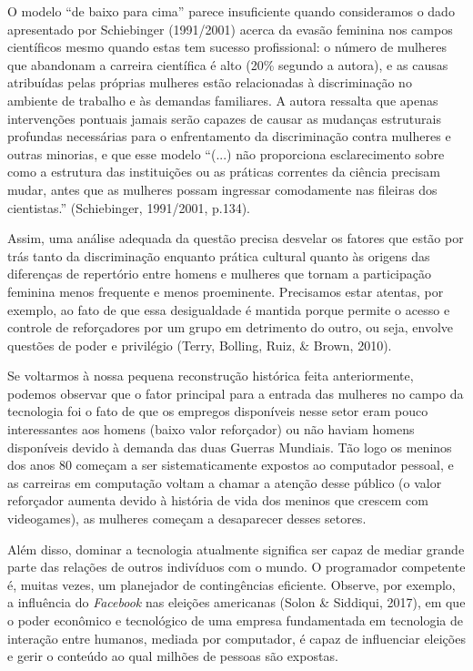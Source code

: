 O modelo “de baixo para cima” parece insuficiente quando consideramos o dado apresentado por Schiebinger (1991/2001) acerca da evasão feminina nos campos científicos mesmo quando estas tem sucesso profissional: o número de mulheres que abandonam a carreira científica é alto (20\% segundo a autora), e as causas atribuídas pelas próprias mulheres estão relacionadas à discriminação no ambiente de trabalho e às demandas familiares. A autora ressalta que apenas intervenções pontuais jamais serão capazes de causar as mudanças estruturais profundas necessárias para o enfrentamento da discriminação contra mulheres e outras minorias, e que esse modelo “(...) não proporciona esclarecimento sobre como a estrutura das instituições ou as práticas correntes da ciência precisam mudar, antes que as mulheres possam ingressar comodamente nas fileiras dos cientistas.” (Schiebinger, 1991/2001, p.134).

Assim, uma análise adequada da questão precisa desvelar os fatores que estão por trás tanto da discriminação enquanto prática cultural quanto às origens das diferenças de repertório entre homens e mulheres que tornam a participação feminina menos frequente e menos proeminente. Precisamos estar atentas, por exemplo, ao fato de que essa desigualdade é mantida porque permite o acesso e controle de reforçadores por um grupo em detrimento do outro, ou seja, envolve questões de poder e privilégio (Terry, Bolling, Ruiz, \& Brown, 2010).

Se voltarmos à nossa pequena reconstrução histórica feita anteriormente, podemos observar que o fator principal para a entrada das mulheres no campo da tecnologia foi o fato de que os empregos disponíveis nesse setor eram pouco interessantes aos homens (baixo valor reforçador) ou não haviam homens disponíveis devido à demanda das duas Guerras Mundiais. Tão logo os meninos dos anos 80 começam a ser sistematicamente expostos ao computador pessoal, e as carreiras em computação voltam a chamar a atenção desse público (o valor reforçador aumenta devido à história de vida dos meninos que crescem com videogames), as mulheres começam a desaparecer desses setores. 

Além disso, dominar a tecnologia atualmente significa ser capaz de mediar grande parte das relações de outros indivíduos com o mundo. O programador competente é, muitas vezes, um planejador de contingências eficiente. Observe, por exemplo, a influência do \textit{Facebook} nas eleições americanas (Solon \& Siddiqui, 2017), em que o poder econômico e tecnológico de uma empresa fundamentada em tecnologia de interação entre humanos, mediada por computador, é capaz de influenciar eleições e gerir o conteúdo ao qual milhões de pessoas são expostas.

